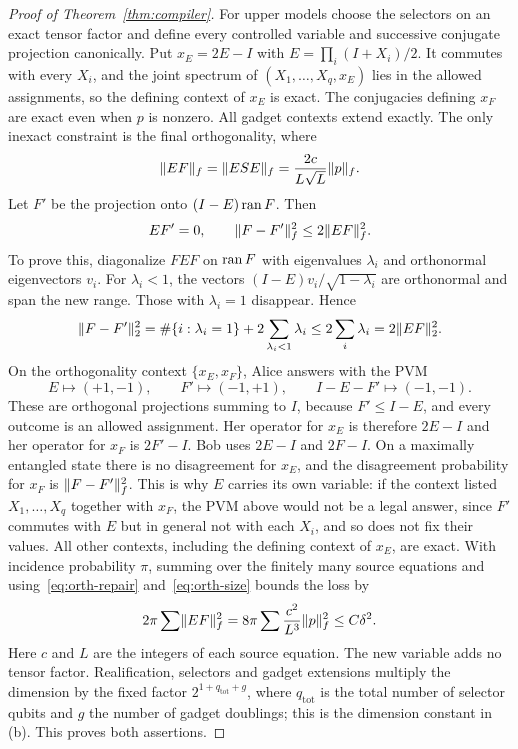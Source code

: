 \begin{proof}[Proof of Theorem~\ref{thm:compiler}]
For upper models choose the selectors on an exact tensor factor and define every controlled variable and successive conjugate projection canonically. Put $x_E=2E-I$ with $E=\prod_i(I+X_i)/2$. It commutes with every $X_i$, and the joint spectrum of $(X_1,\ldots,X_q,x_E)$ lies in the allowed assignments, so the defining context of $x_E$ is exact. The conjugacies defining $x_F$ are exact even when $p$ is nonzero. All gadget contexts extend exactly. The only inexact constraint is the final orthogonality, where
\begin{equation}\label{eq:orth-size}
 \lVert EF\rVert_f=\lVert ESE\rVert_f=\frac{2c}{L\sqrt L}\lVert p\rVert_f.
\end{equation}
Let $F'$ be the projection onto $(I-E)\operatorname{ran} F$. Then
\begin{equation}\label{eq:orth-repair}
 EF'=0,\qquad \lVert F-F'\rVert_f^2\le2\lVert EF\rVert_f^2.
\end{equation}
To prove this, diagonalize $FEF$ on $\operatorname{ran} F$ with eigenvalues $\lambda_i$ and orthonormal eigenvectors $v_i$. For $\lambda_i<1$, the vectors $(I-E)v_i/\sqrt{1-\lambda_i}$ are orthonormal and span the new range. Those with $\lambda_i=1$ disappear. Hence
\[
 \lVert F-F'\rVert_2^2=\#\{i:\lambda_i=1\}+2\sum_{\lambda_i<1}\lambda_i
 \le2\sum_i\lambda_i=2\lVert EF\rVert_2^2.
\]
On the orthogonality context $\{x_E,x_F\}$, Alice answers with the PVM
\[
 E\mapsto(+1,-1),\qquad F'\mapsto(-1,+1),\qquad I-E-F'\mapsto(-1,-1).
\]
These are orthogonal projections summing to $I$, because $F'\le I-E$, and every outcome is an allowed assignment. Her operator for $x_E$ is therefore $2E-I$ and her operator for $x_F$ is $2F'-I$. Bob uses $2E-I$ and $2F-I$. On a maximally entangled state there is no disagreement for $x_E$, and the disagreement probability for $x_F$ is $\lVert F-F'\rVert_f^2$. This is why $E$ carries its own variable: if the context listed $X_1,\ldots,X_q$ together with $x_F$, the PVM above would not be a legal answer, since $F'$ commutes with $E$ but in general not with each $X_i$, and so does not fix their values. All other contexts, including the defining context of $x_E$, are exact. With incidence probability $\pi$, summing over the finitely many source equations and using~\eqref{eq:orth-repair} and~\eqref{eq:orth-size} bounds the loss by
\[
 2\pi\sum\lVert EF\rVert_f^2=8\pi\sum\frac{c^2}{L^3}\lVert p\rVert_f^2\le C\delta^2.
\]
Here $c$ and $L$ are the integers of each source equation. The new variable adds no tensor factor. Realification, selectors and gadget extensions multiply the dimension by the fixed factor $2^{1+q_{\mathrm{tot}}+g}$, where $q_{\mathrm{tot}}$ is the total number of selector qubits and $g$ the number of gadget doublings; this is the dimension constant in (b). This proves both assertions.
\end{proof}
